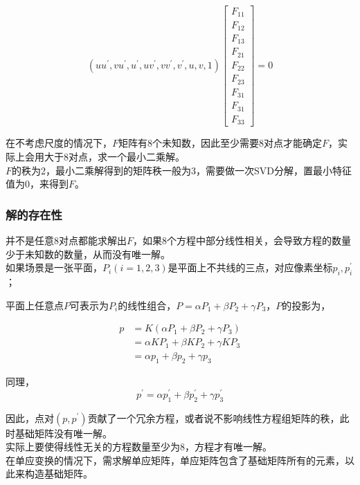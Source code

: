 	$$
		\left(uu^{\prime}, vu^{\prime}, u^{\prime}, uv^{\prime},vv^{\prime},v^{\prime},u,v,1\right)
		\begin{bmatrix*}
			F_{11}\\
			F_{12}\\
			F_{13}\\
			F_{21}\\
			F_{22}\\
			F_{23}\\
			F_{31}\\
			F_{31}\\
			F_{33}
		\end{bmatrix*} = 0
	$$

	在不考虑尺度的情况下，$F$矩阵有8个未知数，因此至少需要8对点才能确定$F$，实际上会用大于8对点，求一个最小二乘解。\\

	$F$的秩为2，最小二乘解得到的矩阵秩一般为3，需要做一次SVD分解，置最小特征值为0，来得到$F$。

	\subsubsection*{解的存在性}
		并不是任意8对点都能求解出$F$，如果8个方程中部分线性相关，会导致方程的数量少于未知数的数量，从而没有唯一解。\\

		如果场景是一张平面，$P_i(i=1,2,3)$是平面上不共线的三点，对应像素坐标$p_i,p^\prime_i$；

		平面上任意点$P$可表示为$P_i$的线性组合，$P=\alpha P_1 + \beta P_2 + \gamma P_3$，$P$的投影为，
		
		\begin{align*}
			p &= K\left(\alpha P_1 + \beta P_2 + \gamma P_3\right)\\
				&= \alpha KP_1 + \beta K P_2 + \gamma KP_3\\
				&= \alpha p_1 + \beta p_2 + \gamma p_3
		\end{align*}

		同理，
		$$
			p^\prime = \alpha p_1^\prime + \beta p_2^\prime + \gamma p_3^\prime
		$$

		因此，点对$(p,p^\prime)$贡献了一个冗余方程，或者说不影响线性方程组矩阵的秩，此时基础矩阵没有唯一解。\\

		实际上要使得线性无关的方程数量至少为8，方程才有唯一解。\\

		在单应变换的情况下，需求解单应矩阵，单应矩阵包含了基础矩阵所有的元素，以此来构造基础矩阵。\\

